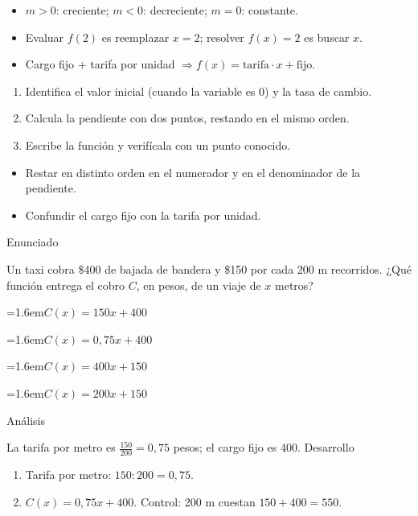 \documentclass[10pt,a4paper,twocolumn]{article}
\newcommand{\alternativa}[2]{\par\noindent\hangindent=1.6em\hangafter=1\makebox[1.6em][l]{\tecla{#1}}#2\par}
\newcommand{\clave}[1]{\par\smallskip{\sffamily\footnotesize\color{esmeralda} Clave \teclaok{#1}}\par}
\begin{document}
\begin{ideasclave}
\begin{itemize}
  \item $m>0$: creciente; $m<0$: decreciente; $m=0$: constante.
  \item Evaluar $f(2)$ es reemplazar $x=2$; resolver $f(x)=2$ es buscar $x$.
  \item Cargo fijo + tarifa por unidad $\Rightarrow f(x)=\text{tarifa}\cdot x+\text{fijo}$.
\end{itemize}
\end{ideasclave}

\begin{metodo}
\begin{enumerate}
  \item Identifica el valor inicial (cuando la variable es 0) y la tasa de cambio.
  \item Calcula la pendiente con dos puntos, restando en el mismo orden.
  \item Escribe la función y verifícala con un punto conocido.
\end{enumerate}
\end{metodo}

\begin{errorfrecuente}
\begin{itemize}
  \item Restar en distinto orden en el numerador y en el denominador de la pendiente.
  \item Confundir el cargo fijo con la tarifa por unidad.
\end{itemize}
\end{errorfrecuente}

\begin{ejemplo}
{\sffamily\footnotesize\color{zinc500} Enunciado}\par
Un taxi cobra \$400 de bajada de bandera y \$150 por cada 200 m recorridos. ¿Qué función entrega el cobro $C$, en pesos, de un viaje de $x$ metros?
\alternativa{A}{$C(x)=150x+400$}
\alternativa{B}{$C(x)=0{,}75x+400$}
\alternativa{C}{$C(x)=400x+150$}
\alternativa{D}{$C(x)=200x+150$}
\clave{B}
{\sffamily\footnotesize\color{zinc500} Análisis}\par La tarifa por metro es $\frac{150}{200}=0{,}75$ pesos; el cargo fijo es 400.
{\sffamily\footnotesize\color{zinc500} Desarrollo}
\begin{enumerate}
  \item Tarifa por metro: $150:200=0{,}75$.
  \item $C(x)=0{,}75x+400$. Control: 200 m cuestan $150+400=550$.
\end{enumerate}
\end{ejemplo}
\end{document}
